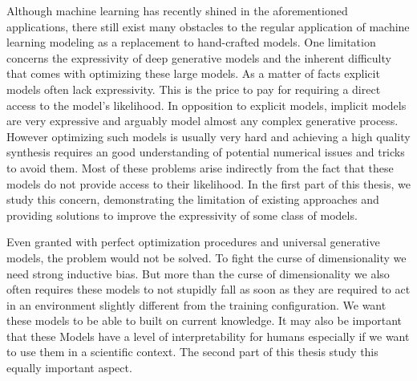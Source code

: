 Although machine learning has recently shined in the aforementioned applications, there still exist many obstacles to the regular application of machine learning modeling as a replacement to hand-crafted models. One limitation concerns the expressivity of deep generative models and the inherent difficulty that comes with optimizing these large models.
As a matter of facts explicit models often lack expressivity. This is the price to pay for requiring a direct access to the model's likelihood.
In opposition to explicit models, implicit models are very expressive and arguably model almost any complex generative process. However optimizing such models is usually very hard and achieving a high quality synthesis requires an good understanding of potential numerical issues and tricks to avoid them. Most of these problems arise indirectly from the fact that these models do not provide access to their likelihood.
In the first part of this thesis, we study this concern, demonstrating the limitation of existing approaches and providing solutions to improve the expressivity of some class of
models.

Even granted with perfect optimization procedures and universal generative models, the problem would not be solved. To fight the curse of dimensionality
we need strong inductive bias. But more than the curse of dimensionality we also often requires these models to not stupidly fall as soon as they are required to
act in an environment slightly different from the training configuration. We want these models to be able to built on current knowledge. It may also be important that these Models
have a level of interpretability for humans especially if we want to use them in a scientific context. The second part of this thesis study this equally important aspect.



